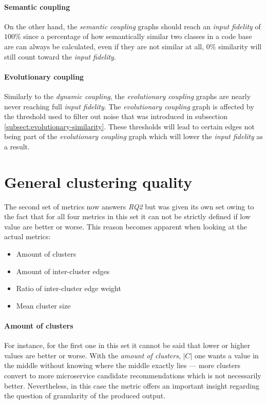 \documentclass[12pt,a4paper]{report}
\begin{document}
\paragraph{Semantic coupling}
On the other hand, the \textit{semantic coupling} graphs should reach an
\textit{input fidelity} of \(100\%\) since a percentage of how semantically
similar two classes in a code base are can always be calculated,
even if they are not similar at all, \(0\%\) similarity will still
count toward the \textit{input fidelity}.

\paragraph{Evolutionary coupling}
Similarly to the \textit{dynamic coupling}, the \textit{evolutionary coupling}
graphs are nearly never reaching full \textit{input fidelity}.
The \textit{evolutionary coupling} graph is affected by the threshold used
to filter out noise that was introduced in subsection \ref{subsect:evolutionary-similarity}.
These thresholds will lead to certain edges not being part of the
\textit{evolutionary coupling} graph which will lower the \textit{input fidelity}
as a result.



\section{General clustering quality}

The second set of metrics now answers \textit{RQ2} but was given its own set
owing to the fact that for all four metrics in this set it can not be strictly
defined if low value are better or worse. This reason becomes apparent when
looking at the actual metrics:
\begin{itemize}[noitemsep]
  \item Amount of clusters
  \item Amount of inter-cluster edges
  \item Ratio of inter-cluster edge weight
  \item Mean cluster size
\end{itemize}

\paragraph{Amount of clusters}
For instance, for the first one in this set it cannot be said that lower or
higher values are better or worse. With the \textit{amount of clusters},
\(\vert C \vert\) one wants a value in the middle without knowing where
the middle exactly lies --- more clusters convert to more microservice
candidate recommendations which is not necessarily better.
Nevertheless, in this case the metric offers an important insight regarding
the question of granularity of the produced output.
\end{document}
